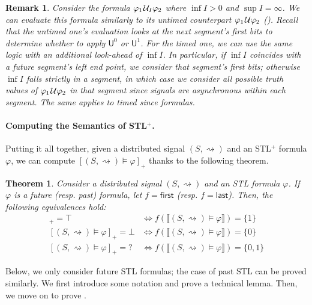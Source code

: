 \documentclass[iicol,lineno]{sn-jnl}
\renewcommand{\cref}{\Cref}
\newcommand{\first}{\textsf{first}}
\newcommand{\last}{\textsf{last}}
\newcommand{\hb}{\rightsquigarrow}
\def\until{\kern.1em\mathcal{U}}
\newcommand{\?}{\text{?}}
\newtheorem{theorem}{Theorem}
\newtheorem{remark}{Remark}
\begin{document}
	\bgroup \color{red}
	\begin{remark}
		Consider the formula $\varphi_1 \until_I \varphi_2$ where $\inf I > 0$ and $\sup I = \infty$.
		We can evaluate this formula similarly to its untimed counterpart $\varphi_1 \until \varphi_2$ (\cref{fig:eval}).
		Recall that the untimed one's evaluation looks at the next segment's first bits to determine whether to apply $\mathsf{U}^0$ or $\mathsf{U}^1$.
		For the timed one, we can use the same logic with an additional look-ahead of $\inf I$.
		In particular, if $\inf I$ coincides with a future segment's left end point, we consider that segment's first bits; otherwise $\inf I$ falls strictly in a segment, in which case we consider all possible truth values of $\varphi_1 \until \varphi_2$ in that segment since signals are asynchronous within each segment.
		The same applies to timed since formulas.
	\end{remark}
	\egroup
	
	
	\paragraph*{Computing the Semantics of STL$^+$.}
	
	Putting it all together, given a distributed signal $(S, {\hb})$ and an STL$^+$ formula $\varphi$, we can compute $[(S,{\hb}) \models \varphi]_+$ thanks to the following theorem.
	
	\bgroup \color{red}
	\begin{theorem} \label{cl:algo}
		Consider a distributed signal $(S,{\hb})$ and an STL formula $\varphi$.
		If $\varphi$ is a future (resp. past) formula, let $f = \first$ (resp. $f = \last$).
		Then, the following equivalences hold:
		\begin{align*}
			[(S,{\hb}) \models \varphi]_+ = \top &\iff f(\llbracket (S, {\hb}) \models \varphi \rrbracket) = \{1\}\\
			[(S,{\hb}) \models \varphi]_+ = \bot &\iff f(\llbracket (S, {\hb}) \models \varphi \rrbracket) = \{0\}\\
			[(S,{\hb}) \models \varphi]_+ = {?} &\iff f(\llbracket (S, {\hb}) \models \varphi \rrbracket) = \{0,1\}
		\end{align*}
	\end{theorem}
	
	Below, we only consider future STL formulas; the case of past STL can be proved similarly.
	We first introduce some notation and prove a technical lemma.
	Then, we move on to prove \cref{cl:algo}. 
	
\end{document}
